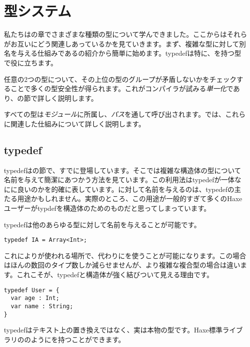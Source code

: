 \chapter{型システム}
\label{type-system}

私たちはの章でさまざまな種類の型について学んできました。ここからはそれらがお互いにどう関連しあっているかを見ていきます。まず、複雑な型に対して別名を与える仕組みであるの紹介から簡単に始めます。typedefは特に、を持つ型で役に立ちます。

任意の2つの型について、その上位の型のグループが矛盾しないかをチェックすることで多くの型安全性が得られます。これがコンパイラが試みる\emph{単一化}であり、の節で詳しく説明します。

すべての型は\emph{モジュール}に所属し、\emph{パス}を通して呼び出されます。では、これらに関連した仕組みについて詳しく説明します。

\section{typedef}
\label{type-system-typedef}

typedefはの節で、すでに登場しています。そこでは複雑な構造体の型について名前を与えて簡潔にあつかう方法を見ています。この利用法はtypedefが一体なにに良いのかを的確に表しています。に対して名前を与えるのは、typedefの主たる用途かもしれません。実際のところ、この用途が一般的すぎて多くのHaxeユーザーがtypdefを構造体のためのものだと思ってしまっています。

typedefは他のあらゆる型に対して名前を与えることが可能です。

\begin{lstlisting}
typedef IA = Array<Int>;
\end{lstlisting}

これによりが使われる場所で、代わりにを使うことが可能になります。この場合はほんの数回のタイプ数しか減らせませんが、より複雑な複合型の場合は違います。これこそが、typedefと構造体が強く結びついて見える理由です。

\begin{lstlisting}
typedef User = {
  var age : Int;
  var name : String;
}
\end{lstlisting}

typedefはテキスト上の置き換えではなく、実は本物の型です。Haxe標準ライブラリののようにを持つことができます。

